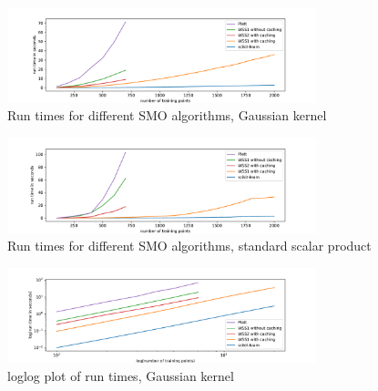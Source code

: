 \begin{figure}[h!]
	\includegraphics[width=0.8\textwidth, center]{benchplot_gauss.pdf}
	\caption{Run times for different SMO algorithms, Gaussian kernel}
	\label{bench_gauss}
\end{figure}

\begin{figure}[h!]
	\includegraphics[width=0.8\textwidth, center]{benchplot_ssp.pdf}
	\caption{Run times for different SMO algorithms, standard scalar product}
	\label{bench_ssp}
\end{figure}

\begin{figure}[h!]
	\includegraphics[width=0.8\textwidth, center]{benchplot_gauss_loglog.pdf}
	\caption{loglog plot of run times, Gaussian kernel}
	\label{bench_gauss_loglog}
\end{figure}





\newpage